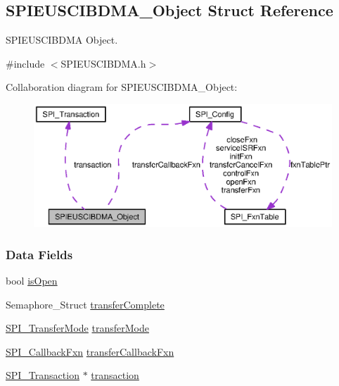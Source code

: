 \subsection{S\+P\+I\+E\+U\+S\+C\+I\+B\+D\+M\+A\+\_\+\+Object Struct Reference}
\label{struct_s_p_i_e_u_s_c_i_b_d_m_a___object}


S\+P\+I\+E\+U\+S\+C\+I\+B\+D\+M\+A Object.  




{\ttfamily \#include $<$S\+P\+I\+E\+U\+S\+C\+I\+B\+D\+M\+A.\+h$>$}



Collaboration diagram for S\+P\+I\+E\+U\+S\+C\+I\+B\+D\+M\+A\+\_\+\+Object\+:
\nopagebreak
\begin{figure}[H]
\begin{center}
\leavevmode
\includegraphics[width=350pt]{struct_s_p_i_e_u_s_c_i_b_d_m_a___object__coll__graph}
\end{center}
\end{figure}
\subsubsection*{Data Fields}
\begin{DoxyCompactItemize}
\item 
bool \hyperlink{struct_s_p_i_e_u_s_c_i_b_d_m_a___object_a00fad6593577c719027540fb731597e5}{is\+Open}
\item 
Semaphore\+\_\+\+Struct \hyperlink{struct_s_p_i_e_u_s_c_i_b_d_m_a___object_aeaff6b399015aa5eaf8c2a16b97babb9}{transfer\+Complete}
\item 
\hyperlink{_s_p_i_8h_ab9ea76c6529d6076eee5e1c4a5a92c6f}{S\+P\+I\+\_\+\+Transfer\+Mode} \hyperlink{struct_s_p_i_e_u_s_c_i_b_d_m_a___object_a0768312e5a55b8c73dcabb47b373fd88}{transfer\+Mode}
\item 
\hyperlink{_s_p_i_8h_a207e2d5a7e7ea5606b6995b6485ca015}{S\+P\+I\+\_\+\+Callback\+Fxn} \hyperlink{struct_s_p_i_e_u_s_c_i_b_d_m_a___object_a1a5d8467541e90687b6c9034e45dfe75}{transfer\+Callback\+Fxn}
\item 
\hyperlink{struct_s_p_i___transaction}{S\+P\+I\+\_\+\+Transaction} $\ast$ \hyperlink{struct_s_p_i_e_u_s_c_i_b_d_m_a___object_a4b218a6096bec10cc51eeb6597ac9f8c}{transaction}
\end{DoxyCompactItemize}


